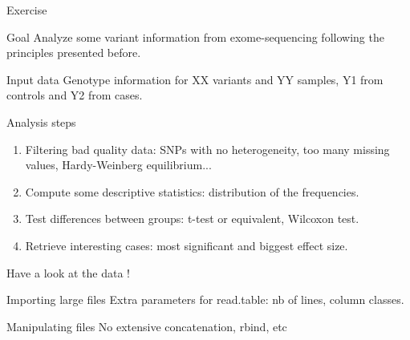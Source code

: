\documentclass[10pt]{beamer}
\begin{document}
\begin{frame}{Exercise}
  \begin{block}{Goal}
    Analyze some variant information from exome-sequencing following the principles presented before.
  \end{block}
  \begin{block}{Input data}
    Genotype information for XX variants and YY samples, Y1 from controls and Y2 from cases.
  \end{block}
  \begin{block}{Analysis steps}
    \begin{enumerate}
    \item Filtering bad quality data: SNPs with no heterogeneity, too many missing values, Hardy-Weinberg equilibrium...
    \item Compute some descriptive statistics: distribution of the frequencies.
    \item Test differences between groups: t-test or equivalent, Wilcoxon test. 
    \item Retrieve interesting cases: most significant and biggest effect size.
    \end{enumerate}
  \end{block}
  Have a look at the data !
\end{frame}

\begin{frame}{Importing large files}
  Extra parameters for read.table: nb of lines, column classes.
\end{frame}

\begin{frame}{Manipulating files}
  No extensive concatenation, rbind, etc
\end{frame}
\end{document}

